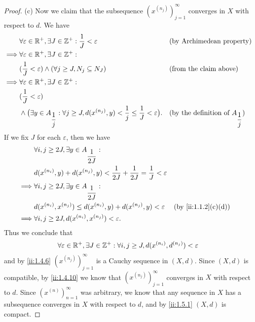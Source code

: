 \begin{proof}{(c)}
  Now we claim that the subsequence \((x^{(n_j)})_{j = 1}^\infty\) converges in \(X\) with respect to \(d\).
  We have
  \begin{align*}
             & \forall \varepsilon \in \mathbb{R}^+, \exists J \in \mathbb{Z}^+ : \dfrac{1}{J} < \varepsilon                                                      &  & \text{(by Archimedean property)}                   \\
    \implies & \forall \varepsilon \in \mathbb{R}^+, \exists J \in \mathbb{Z}^+ :                                                                                                                                         \\
             & (\dfrac{1}{J} < \varepsilon) \land (\forall j \geq J, N_j \subseteq N_J)                                                           &  & \text{(from the claim above)}                      \\
    \implies & \forall \varepsilon \in \mathbb{R}^+, \exists J \in \mathbb{Z}^+ :                                                                                                                                         \\
             & (\dfrac{1}{J} < \varepsilon)                                                                                                                                                               \\
             & \land \big(\exists y \in A_{\dfrac{1}{j}} : \forall j \geq J, d(x^{(n_j)}, y) < \dfrac{1}{j} \leq \dfrac{1}{J} < \varepsilon\big). &  & \text{(by the definition of \(A_{\dfrac{1}{j}}\))}
  \end{align*}
  If we fix \(J\) for each \(\varepsilon\), then we have
  \begin{align*}
             & \forall i, j \geq 2J, \exists y \in A_{\dfrac{1}{2J}} :                                                                \\
             & d(x^{(n_i)}, y) + d(x^{(n_j)}, y) < \dfrac{1}{2J} + \dfrac{1}{2J} = \dfrac{1}{J} < \varepsilon                         \\
    \implies & \forall i, j \geq 2J, \exists y \in A_{\dfrac{1}{2J}} :                                                                \\
             & d(x^{(n_i)}, x^{(n_j)}) \leq d(x^{(n_i)}, y) + d(x^{(n_j)}, y) < \varepsilon                   &  & \by{ii:1.1.2}[c,d] \\
    \implies & \forall i, j \geq 2J, d(x^{(n_i)}, x^{(n_j)}) < \varepsilon.
  \end{align*}
  Thus we conclude that
  \[
    \forall \varepsilon \in \mathbb{R}^+, \exists J \in \mathbb{Z}^+ : \forall i, j \geq J, d(x^{(n_i)}, d^{(n_j)}) < \varepsilon
  \]
  and by \cref{ii:1.4.6} \((x^{(n_j)})_{j = 1}^\infty\) is a Cauchy sequence in \((X, d)\).
  Since \((X, d)\) is compatible, by \cref{ii:1.4.10} we know that \((x^{(n_j)})_{j = 1}^\infty\) converges in \(X\) with respect to \(d\).
  Since \((x^{(n)})_{n = 1}^\infty\) was arbitrary, we know that any sequence in \(X\) has a subsequence converges in \(X\) with respect to \(d\), and by \cref{ii:1.5.1} \((X, d)\) is compact.
\end{proof}

